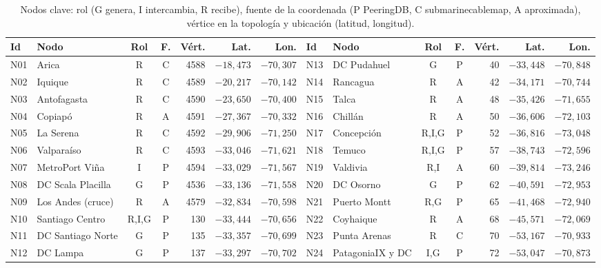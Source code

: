 \documentclass[conference]{IEEEtran}
\begin{document}
\begin{table}[t]
\centering
\caption{Nodos clave: rol (G genera, I intercambia, R recibe), fuente de la coordenada (P PeeringDB, C submarinecablemap, A aproximada), vértice en la topología y ubicación (latitud, longitud).}
\label{tab:nodos}
\scriptsize
\setlength{\tabcolsep}{3pt}
\begin{tabular}{@{}llccrrrllccrrr@{}}
\toprule
Id & Nodo & Rol & F. & Vért. & Lat. & Lon. & Id & Nodo & Rol & F. & Vért. & Lat. & Lon. \\
\midrule
N01 & Arica & R & C & 4588 & $-18{,}473$ & $-70{,}307$ & N13 & DC Pudahuel & G & P & 40 & $-33{,}448$ & $-70{,}848$ \\
N02 & Iquique & R & C & 4589 & $-20{,}217$ & $-70{,}142$ & N14 & Rancagua & R & A & 42 & $-34{,}171$ & $-70{,}744$ \\
N03 & Antofagasta & R & C & 4590 & $-23{,}650$ & $-70{,}400$ & N15 & Talca & R & A & 48 & $-35{,}426$ & $-71{,}655$ \\
N04 & Copiapó & R & A & 4591 & $-27{,}367$ & $-70{,}332$ & N16 & Chillán & R & A & 50 & $-36{,}606$ & $-72{,}103$ \\
N05 & La Serena & R & C & 4592 & $-29{,}906$ & $-71{,}250$ & N17 & Concepción & R,I,G & P & 52 & $-36{,}816$ & $-73{,}048$ \\
N06 & Valparaíso & R & C & 4593 & $-33{,}046$ & $-71{,}621$ & N18 & Temuco & R,I,G & P & 57 & $-38{,}743$ & $-72{,}596$ \\
N07 & MetroPort Viña & I & P & 4594 & $-33{,}029$ & $-71{,}567$ & N19 & Valdivia & R,I & A & 60 & $-39{,}814$ & $-73{,}246$ \\
N08 & DC Scala Placilla & G & P & 4536 & $-33{,}136$ & $-71{,}558$ & N20 & DC Osorno & G & P & 62 & $-40{,}591$ & $-72{,}953$ \\
N09 & Los Andes (cruce) & R & A & 4579 & $-32{,}834$ & $-70{,}598$ & N21 & Puerto Montt & R,G & P & 65 & $-41{,}468$ & $-72{,}940$ \\
N10 & Santiago Centro & R,I,G & P & 130 & $-33{,}444$ & $-70{,}656$ & N22 & Coyhaique & R & A & 68 & $-45{,}571$ & $-72{,}069$ \\
N11 & DC Santiago Norte & G & P & 135 & $-33{,}357$ & $-70{,}699$ & N23 & Punta Arenas & R & C & 70 & $-53{,}167$ & $-70{,}933$ \\
N12 & DC Lampa & G & P & 137 & $-33{,}297$ & $-70{,}702$ & N24 & PatagoniaIX y DC & I,G & P & 72 & $-53{,}047$ & $-70{,}873$ \\
\bottomrule
\end{tabular}
\end{table}
\end{document}
